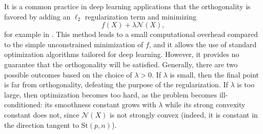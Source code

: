 \documentclass[twoside,11pt]{article}
\newcommand{\stiefel}{{\mathrm{St}(p, n)}}
\begin{document}
It is a common practice in deep learning applications that the orthogonality is favored by adding an $\ell_2$ regularization term and minimizing
\begin{equation*}
    f(X) + \lambda\mathcal{N}(X),
\end{equation*}
for example in \citep{balestriero2018spline, xie2017all, bansal2018can}.
This method leads to a small computational overhead compared to the simple unconstrained minimization of $f$, and it allows the use of standard optimization algorithms tailored for deep learning. However, it provides no guarantee that the orthogonality will be satisfied. Generally, there are two possible outcomes based on the choice of $\lambda>0$. If $\lambda$ is small, then the final point is far from orthogonality, defeating the purpose of the regularization. If $\lambda$ is too large, then optimization becomes too hard, as the problem becomes ill-conditioned: its smoothness constant grows with $\lambda$ while its strong convexity constant does not, since $\mathcal{N}(X)$ is not strongly convex (indeed, it is constant in the direction tangent to $\stiefel$).

%
%
%
%
%
%

%
%
\end{document}
